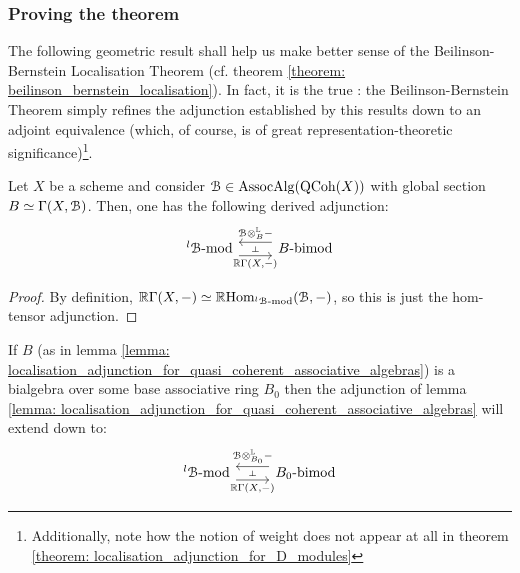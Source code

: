         \subsubsection{Proving the theorem}
            The following geometric result shall help us make better sense of the Beilinson-Bernstein Localisation Theorem (cf. theorem \ref{theorem: beilinson_bernstein_localisation}). In fact, it is the true : the Beilinson-Bernstein Theorem simply refines the adjunction established by this results down to an adjoint equivalence (which, of course, is of great representation-theoretic significance)\footnote{Additionally, note how the notion of weight does not appear at all in theorem \ref{theorem: localisation_adjunction_for_D_modules}}.
            
            \begin{lemma} \label{lemma: localisation_adjunction_for_quasi_coherent_associative_algebras}
                Let $X$ be a scheme and consider $\mathcal{B} \in \mathrm{Assoc}\mathrm{Alg}(\mathrm{QCoh}(X))$ with global section $B \simeq \Gamma(X, \mathcal{B})$. Then, one has the following derived adjunction:
                    $$
                        \begin{tikzcd}
                        	{{}^l\calB\mod} & {B\bimod}
                        	\arrow[""{name=0, anchor=center, inner sep=0}, "{\R\Gamma(X, -)}"', shift right=2, from=1-1, to=1-2]
                        	\arrow[""{name=1, anchor=center, inner sep=0}, "{\calB \tensor_B^{\L} -}"', shift right=2, from=1-2, to=1-1]
                        	\arrow["\dashv"{anchor=center, rotate=-90}, draw=none, from=1, to=0]
                        \end{tikzcd}
                    $$
            \end{lemma}
                \begin{proof}
                    By definition, $\mathbb{R}\Gamma(X, -) \simeq \mathbb{R}\mathrm{Hom}_{{}^l\mathcal{B}\text{-}\mathrm{mod}}(\mathcal{B}, -)$, so this is just the hom-tensor adjunction.
                \end{proof}
            \begin{corollary} \label{coro: localisation_adjunction_for_quasi_coherent_associative_algebras}
                If $B$ (as in lemma \ref{lemma: localisation_adjunction_for_quasi_coherent_associative_algebras}) is a bialgebra over some  base associative ring $B_0$ then the adjunction of lemma \ref{lemma: localisation_adjunction_for_quasi_coherent_associative_algebras} will extend down to:
                    $$
                        \begin{tikzcd}
                        	{{}^l\calB\mod} & {B_0\bimod}
                        	\arrow[""{name=0, anchor=center, inner sep=0}, "{\R\Gamma(X, -)}"', shift right=2, from=1-1, to=1-2]
                        	\arrow[""{name=1, anchor=center, inner sep=0}, "{\calB \tensor_{B_0}^{\L} -}"', shift right=2, from=1-2, to=1-1]
                        	\arrow["\dashv"{anchor=center, rotate=-90}, draw=none, from=1, to=0]
                        \end{tikzcd}
                    $$
            \end{corollary}
